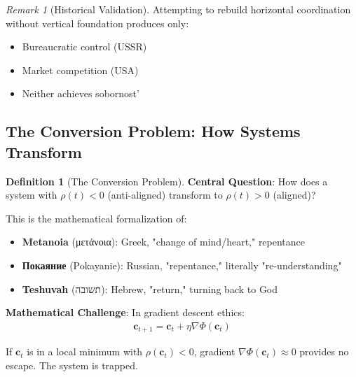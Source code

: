 \documentclass[11pt,a4paper]{article}
\theoremstyle{definition}
\newtheorem{definition}{Definition}[section]
\theoremstyle{remark}
\newtheorem{remark}{Remark}[section]
\newcommand{\cc}{\mathbf{c}}
\begin{document}
\begin{enumerate}
\begin{remark}[Historical Validation]
Attempting to rebuild horizontal coordination without vertical foundation produces only:
\begin{itemize}
    \item Bureaucratic control (USSR)
    \item Market competition (USA)
    \item Neither achieves sobornost'
\end{itemize}
\end{remark}

\subsection{The Conversion Problem: How Systems Transform}

\begin{definition}[The Conversion Problem]
\textbf{Central Question}: How does a system with \(\rho(t) < 0\) (anti-aligned) transform to \(\rho(t) > 0\) (aligned)?

This is the mathematical formalization of:
\begin{itemize}
    \item \textbf{Metanoia} (μετάνοια): Greek, "change of mind/heart," repentance
    \item \textbf{Покаяние} (Pokayanie): Russian, "repentance," literally "re-understanding"
    \item \textbf{Teshuvah} (תשובה): Hebrew, "return," turning back to God
\end{itemize}

\textbf{Mathematical Challenge}: In gradient descent ethics:
\begin{align}
\cc_{t+1} = \cc_t + \eta \nabla \Phi(\cc_t)
\end{align}

If \(\cc_t\) is in a local minimum with \(\rho(\cc_t) < 0\), gradient \(\nabla \Phi(\cc_t) \approx 0\) provides no escape. The system is trapped.
\end{definition}

\begin{figure}[H]
\centering
{}
\end{figure}
\end{enumerate}
\end{document}
